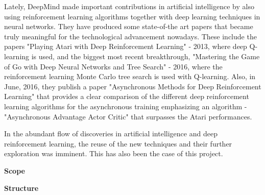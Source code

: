 Lately, DeepMind made important contributions in artificial intelligence by also using reinforcement learning algorithms together with deep learning techniques in neural networks. They have produced some state-of-the art papers that became truly meaningful for the technological advancement nowadays. These include the papers "Playing Atari with Deep Reinforcement Learning" \cite{DBLP:journals/corr/MnihKSGAWR13} - 2013, where deep Q-learning is used, and the biggest most recent breakthrough, "Mastering the Game of Go with Deep Neural Networks and Tree Search" \cite{Silver_2016} - 2016, where the reinforcement learning Monte Carlo tree search is used with Q-learning. Also, in June, 2016, they publish a paper "Asynchronous Methods for Deep Reinforcement Learning" \cite{DBLP:journals/corr/MnihBMGLHSK16} that provides a clear comparison of the different deep reinforcement learning algorithms for the asynchronous training emphasizing an algorithm - "Asynchronous Advantage Actor Critic" that surpasses the Atari performances.

In the abundant flow of discoveries in artificial intelligence and deep reinforcement learning, the reuse of the new techniques and their further exploration was imminent. This has also been the case of this project.

\textbf{Scope}

\textbf{Structure}
